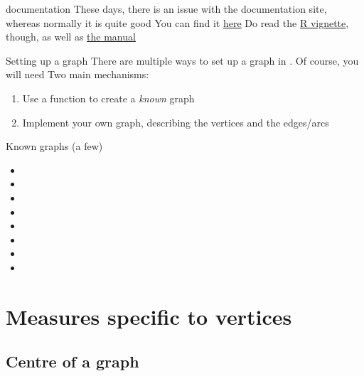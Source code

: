 \documentclass[aspectratio=169]{beamer}\usepackage[]{graphicx}\usepackage[]{xcolor}
\begin{document}
\begin{frame}{ documentation}
	These days, there is an issue with the  documentation site, whereas normally it is quite good
	\vfill
	You can find it \href{https://igraph.org/r/doc/}{here}
	\vfill
	Do read the \href{https://cran.r-project.org/web/packages/igraph/vignettes/igraph.html}{R vignette}, though, as well as \href{https://cran.r-project.org/web/packages/igraph/igraph.pdf}{the manual}
\end{frame}

\begin{frame}{Setting up a graph}
	There are multiple ways to set up a graph in . Of course, you will need 
	\vfill
	Two main mechanisms:
	\begin{enumerate}
		\item Use a function to create a \emph{known} graph 
		\item Implement your own graph, describing the vertices and the edges/arcs
	\end{enumerate}
\end{frame}

\begin{frame}{Known graphs (a few)}
	\begin{itemize}
		\item {}
		\item {}
		\item {}
		\item {}
		\item {}
		\item {}
		\item {}
		\item {}
	\end{itemize}
\end{frame}


\section{Measures specific to vertices}

\subsection{Centre of a graph}
\end{document}
